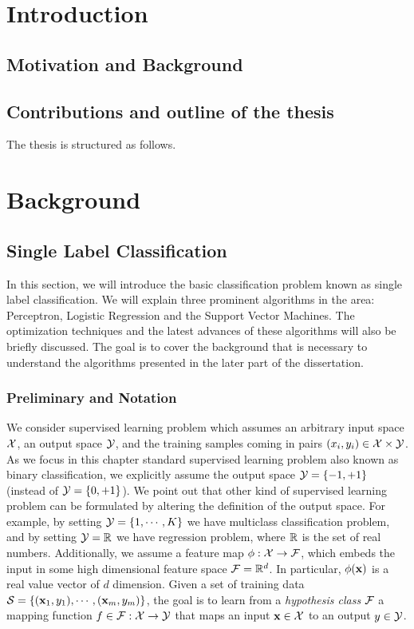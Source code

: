 


\chapter{Introduction}
\section{Motivation and Background}
\section{Contributions and outline of the thesis}

The thesis is structured as follows.


\chapter{Background}


%
%
%
\section{Single Label Classification}

In this section, we will introduce the basic classification problem known as single label classification.
We will explain three prominent algorithms in the area: Perceptron, Logistic Regression and the Support Vector Machines.
The optimization techniques and the latest advances of these algorithms will also be briefly discussed.
The goal is to cover the background that is necessary to understand the algorithms presented in the later part of the dissertation. 

%
%
\subsection{Preliminary and Notation}\label{singlelabel_preliminary}
We consider supervised learning problem which assumes an arbitrary input space $\mathcal{X}$, an output space $\mathcal{Y}$, and the training samples coming in pairs $(x_i,y_i)\in\mathcal{X}\times\mathcal{Y}$.
As we focus in this chapter standard supervised learning problem also known as binary classification, we explicitly assume the output space $\mathcal{Y}=\{-1,+1\}$ (instead of $\mathcal{Y}=\{0,+1\}$).
We point out that other kind of supervised learning problem can be formulated by altering the definition of the output space.
For example, by setting $\mathcal{Y}=\{1,\cdots,K\}$ we have multiclass classification problem, and by setting $\mathcal{Y}=\mathbb{R}$ we have regression problem, where $\mathbb{R}$ is the set of real numbers.
Additionally, we assume a feature map $\mathbf{\phi}:\mathcal{X}\rightarrow\mathcal{F}$, which embeds the input in some high dimensional feature space $\mathcal{F}=\mathbb{R}^d$.
In particular, $\mathbf{\phi}(\mathbf {x})$ is a real value vector of $d$ dimension.
Given a set of training data $\mathcal{S}=\{(\mathbf {x}_1,y_1),\cdots,(\mathbf {x}_m,y_m)\}$, the goal is to learn from a \textit{hypothesis class} $\mathcal{F}$ a mapping function $f\in\mathcal{F}:\mathcal{X}\rightarrow\mathcal{Y}$  that maps an input $\mathbf {x}\in\mathcal{X}$ to an output $y\in\mathcal{Y}$. 

